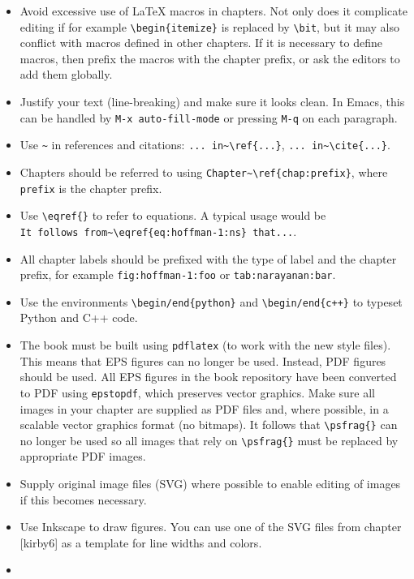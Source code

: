 \documentclass{article}
\begin{document}
\begin{itemize}
\item
  Avoid excessive use of \LaTeX{} macros in chapters. Not only does it
  complicate editing if for example \verb|\begin{itemize}| is replaced
  by \verb|\bit|, but it may also conflict with macros defined in
  other chapters. If it is necessary to define macros, then prefix the
  macros with the chapter prefix, or ask the editors to add them
  globally.
\item
  Justify your text (line-breaking) and make sure it looks clean. In
  Emacs, this can be handled by \verb|M-x auto-fill-mode| or pressing
  \verb|M-q| on each paragraph.
\item
  Use \verb|~| in references and citations: \verb|... in~\ref{...}|,
  \verb|... in~\cite{...}|.
\item
  Chapters should be referred to using \verb|Chapter~\ref{chap:prefix}|,
  where \verb|prefix| is the chapter prefix.
\item
  Use \verb|\eqref{}| to refer to equations. A typical usage would be \\
  \verb|It follows from~\eqref{eq:hoffman-1:ns} that...|.
\item
  All chapter labels should be prefixed with the type of label and the
  chapter prefix, for example \verb|fig:hoffman-1:foo| or
  \verb|tab:narayanan:bar|.
\item
  Use the environments \verb|\begin/end{python}| and
  \verb|\begin/end{c++}| to typeset Python and C++ code.
\item
  The book must be built using \verb|pdflatex| (to work with the new
  style files). This means that EPS figures can no longer be
  used. Instead, PDF figures should be used. All EPS figures in the
  book repository have been converted to PDF using \verb|epstopdf|,
  which preserves vector graphics. Make sure all images in your
  chapter are supplied as PDF files and, where possible, in a scalable
  vector graphics format (no bitmaps). It follows that
  \verb|\psfrag{}| can no longer be used so all images that rely on
  \verb|\psfrag{}| must be replaced by appropriate PDF images.
\item
  Supply original image files (SVG) where possible to enable editing
  of images if this becomes necessary.
\item
  Use Inkscape to draw figures. You can use one of the SVG files from
  chapter [kirby6] as a template for line widths and colors.
\item

\end{itemize}
\end{document}

